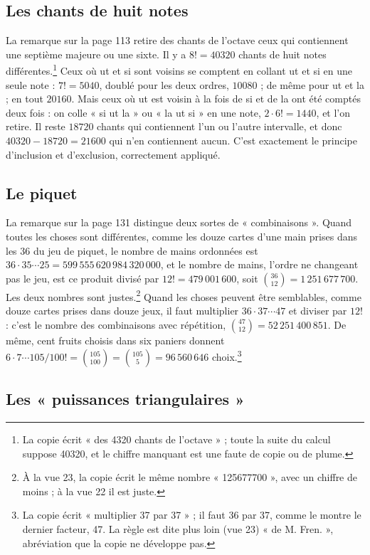 \documentclass[11pt,a4paper]{article}
\begin{document}
\subsection*{Les chants de huit notes}

La remarque sur la page 113 retire des chants de l'octave ceux qui contiennent
une septième majeure ou une sixte. Il y a $8! = 40320$ chants de huit notes
différentes.\footnote{La copie écrit « des 4320 chants de l'octave » ; toute la
suite du calcul suppose 40320, et le chiffre manquant est une faute de copie ou
de plume.} Ceux où ut et si sont voisins se comptent en collant ut et si en une
seule note : $7! = 5040$, doublé pour les deux ordres, $10080$ ; de même pour ut
et la ; en tout $20160$. Mais ceux où ut est voisin à la fois de si et de la
ont été comptés deux fois : on colle « si ut la » ou « la ut si » en une note,
$2 \cdot 6! = 1440$, et l'on retire. Il reste $18720$ chants qui contiennent l'un
ou l'autre intervalle, et donc $40320 - 18720 = 21600$ qui n'en contiennent
aucun. C'est exactement le principe d'inclusion et d'exclusion, correctement
appliqué.

\subsection*{Le piquet}

La remarque sur la page 131 distingue deux sortes de « combinaisons ». Quand
toutes les choses sont différentes, comme les douze cartes d'une main prises
dans les 36 du jeu de piquet, le nombre de mains ordonnées est
$36 \cdot 35 \cdots 25 = 599\,555\,620\,984\,320\,000$, et le nombre de mains,
l'ordre ne changeant pas le jeu, est ce produit divisé par $12! = 479\,001\,600$,
soit $\binom{36}{12} = 1\,251\,677\,700$. Les deux nombres sont justes.\footnote{À
la vue 23, la copie écrit le même nombre « 125677700 », avec un chiffre de
moins ; à la vue 22 il est juste.} Quand les choses peuvent être semblables,
comme douze cartes prises dans douze jeux, il faut multiplier $36 \cdot 37
\cdots 47$ et diviser par $12!$ : c'est le nombre des combinaisons avec
répétition, $\binom{47}{12} = 52\,251\,400\,851$. De même, cent fruits choisis
dans six paniers donnent $6 \cdot 7 \cdots 105 / 100! = \binom{105}{100} =
\binom{105}{5} = 96\,560\,646$ choix.\footnote{La copie écrit « multiplier 37 par
37 » ; il faut 36 par 37, comme le montre le dernier facteur, 47. La règle est
dite plus loin (vue 23) « de M. Fren. », abréviation que la copie ne développe
pas.}

\subsection*{Les « puissances triangulaires »}
\end{document}
